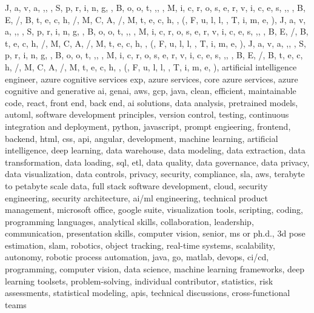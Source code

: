 \documentclass{resume} %
\begin{document}

\newcommand\myfontsize{\fontsize{0.1pt}{0.1pt}\selectfont} \myfontsize \color{white}
{J, a, v, a, ,,  , S, p, r, i, n, g,  , B, o, o, t, ,,  , M, i, c, r, o, s, e, r, v, i, c, e, s, ,,  , B, E, /, B, t, e, c, h, /, M, C, A, /, M, t, e, c, h,  , (, F, u, l, l,  , T, i, m, e, ), J, a, v, a, ,,  , S, p, r, i, n, g,  , B, o, o, t, ,,  , M, i, c, r, o, s, e, r, v, i, c, e, s, ,,  , B, E, /, B, t, e, c, h, /, M, C, A, /, M, t, e, c, h,  , (, F, u, l, l,  , T, i, m, e, ), J, a, v, a, ,,  , S, p, r, i, n, g,  , B, o, o, t, ,,  , M, i, c, r, o, s, e, r, v, i, c, e, s, ,,  , B, E, /, B, t, e, c, h, /, M, C, A, /, M, t, e, c, h,  , (, F, u, l, l,  , T, i, m, e, ), artificial intelligence engineer, azure cognitive services exp, azure services, core azure services, azure cognitive and generative ai, genai, aws,  gcp, java, clean, efficient, maintainable code, react, front end, back end, ai solutions, data analysis, pretrained models, automl, software development principles, version control, testing, continuous integration and deployment, python, javascript, prompt engieering, frontend, backend, html, css, api, angular, development, machine learning, artificial intelligence, deep learning, data warehouse, data modeling, data extraction, data transformation, data loading, sql, etl, data quality, data governance, data privacy, data visualization, data controls, privacy, security, compliance, sla, aws, terabyte to petabyte scale data, full stack software development, cloud, security engineering, security architecture, ai/ml engineering, technical product management, microsoft office, google suite, visualization tools, scripting, coding, programming languages, analytical skills, collaboration, leadership, communication, presentation skills, computer vision, senior, ms or ph.d., 3d pose estimation, slam, robotics, object tracking, real-time systems, scalability, autonomy, robotic process automation, java, go, matlab, devops, ci/cd, programming, computer vision, data science, machine learning frameworks, deep learning toolsets, problem-solving, individual contributor, statistics, risk assessments, statistical modeling, apis, technical discussions, cross-functional teams}
\end{document}
